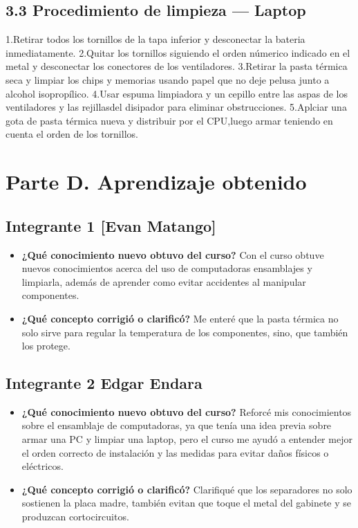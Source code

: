 \documentclass{article}
\begin{document}
\subsection{3.3 Procedimiento de limpieza — Laptop}
\label{sec:orgdd8bbe8}
1.Retirar todos los tornillos de la tapa inferior y desconectar la
bateria inmediatamente.
2.Quitar los tornillos siguiendo el orden númerico indicado en el
metal y desconectar los conectores de los ventiladores.
3.Retirar la pasta térmica seca y limpiar los chips y memorias
usando papel que no deje pelusa junto a alcohol isopropílico.
4.Usar espuma limpiadora y un cepillo entre las aspas de los
ventiladores y las rejillasdel disipador para eliminar obstrucciones.
5.Aplciar una gota de pasta térmica nueva y distribuir por el
CPU,luego armar teniendo en cuenta el orden de los tornillos.

\section{Parte D. Aprendizaje obtenido}
\label{sec:orgec391aa}

\subsection{Integrante 1 [Evan Matango]}
\label{sec:org9ab5164}
\begin{itemize}
\item \textbf{¿Qué conocimiento nuevo obtuvo del curso?} Con el curso
obtuve nuevos conocimientos acerca del uso de computadoras
ensamblajes y limpiarla, además de aprender como evitar
accidentes al manipular componentes.
\item \textbf{¿Qué concepto corrigió o clarificó?} Me enteré que la pasta
térmica no solo sirve para regular la temperatura de los
componentes, sino, que también los protege.
\end{itemize}

\subsection{Integrante 2 Edgar Endara}
\label{sec:org23a4b84}
\begin{itemize}
\item \textbf{¿Qué conocimiento nuevo obtuvo del curso?} Reforcé mis
conocimientos sobre el ensamblaje de computadoras, ya que tenía
una idea previa sobre armar una PC y limpiar una laptop, pero el
curso me ayudó a entender mejor el orden correcto de instalación
y las medidas para evitar daños físicos o eléctricos.
\item \textbf{¿Qué concepto corrigió o clarificó?} Clarifiqué que los
separadores no solo sostienen la placa madre, también evitan que
toque el metal del gabinete y se produzcan cortocircuitos.
\end{itemize}
\end{document}
